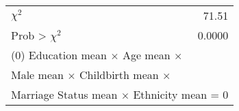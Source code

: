 \begin{tabular}{lr}
\toprule
$\chi^2$ &     71.51 \\
Prob > $\chi^2$ &    0.0000 \\
\bottomrule
\multicolumn{2}{l}{\footnotesize (0) Education mean $\times$ Age mean $\times$}\\
\multicolumn{2}{l}{\footnotesize \space\space\space\space\space Male mean $\times$ Childbirth mean $\times$}\\
\multicolumn{2}{l}{\footnotesize \space\space\space\space\space Marriage Status mean $\times$ Ethnicity mean = 0}\\
\end{tabular}
